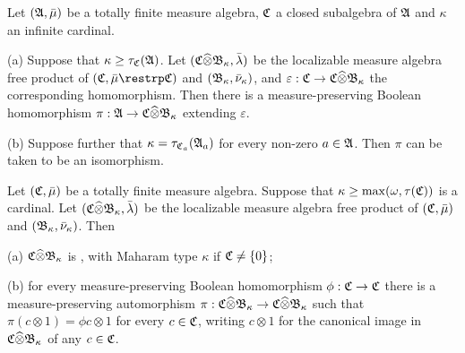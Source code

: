  Let $(\frak A,\bar\mu)$ be a totally finite
measure algebra, $\frak C$ a closed subalgebra of $\frak A$ and $\kappa$
an infinite cardinal.

(a) Suppose that $\kappa\ge\tau_{\frak C}(\frak A)$.   Let
$(\frak C\widehat{\otimes}\frak B_{\kappa},\bar\lambda)$ be the localizable
measure algebra free product of $(\frak C,\bar\mu\restrp\frak C)$ and
$(\frak B_{\kappa},\bar\nu_{\kappa})$, and
$\varepsilon:\frak C\to\frak C\widehat{\otimes}\frak B_{\kappa}$ the
corresponding homomorphism.
Then there is a measure-preserving Boolean homomorphism
$\pi:\frak A\to\frak C\widehat{\otimes}\frak B_{\kappa}$ extending
$\varepsilon$.

(b) Suppose further that $\kappa=\tau_{\frak C_a}(\frak A_a)$
for every non-zero $a\in\frak A$.   Then $\pi$ can be
taken to be an isomorphism.


 Let $(\frak C,\bar\mu)$ be a
totally finite measure algebra.
Suppose that $\kappa\ge\max(\omega,\tau(\frak C))$ is
a cardinal.   Let
$(\frak C\widehat{\otimes}\frak B_{\kappa},\bar\lambda)$ be the
localizable measure algebra free product of $(\frak C,\bar\mu)$ and
$(\frak B_{\kappa},\bar\nu_{\kappa})$.   Then

(a) $\frak C\widehat{\otimes}\frak B_{\kappa}$ is \Mth,
with Maharam type $\kappa$ if $\frak C\ne\{0\}$;

(b) for every measure-preserving Boolean homomorphism
$\phi:\frak C\to\frak C$ there is a measure-preserving automorphism
$\pi:\frak C\widehat{\otimes}\frak B_{\kappa}
\to\frak C\widehat{\otimes}\frak B_{\kappa}$ such that
$\pi(c\otimes 1)=\phi c\otimes 1$ for every
$c\in\frak C$, writing $c\otimes 1$ for the canonical image in
$\frak C\widehat{\otimes}\frak B_{\kappa}$ of any $c\in\frak C$.

